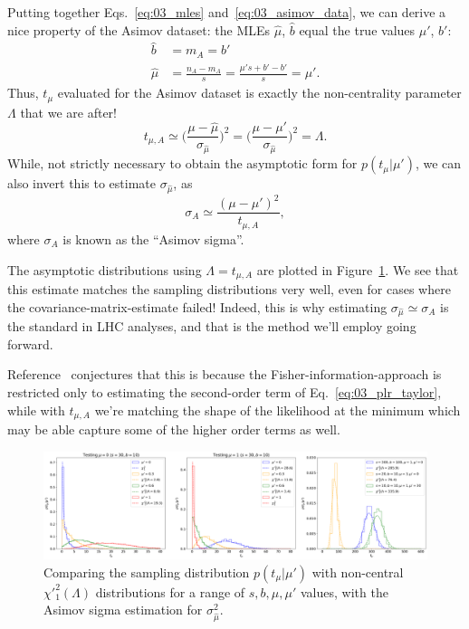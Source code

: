Putting together Eqs.~\ref{eq:03_mles} and~\ref{eq:03_asimov_data}, we can derive a nice property of the Asimov dataset: the MLEs $\hat\mu$, $\hat b$ equal the true values $\mu'$, $b'$:
\begin{align}
    \hat b &= m_A = b' \\
    \hat \mu &= \frac{n_A - m_A}{s} = \frac{\mu's + b' - b'}{s} = \mu'.
\label{eq:03_asimov_mles}
\end{align}
Thus, $t_\mu$ evaluated for the Asimov dataset is exactly the non-centrality parameter $\Lambda$ that we are after!
\begin{equation}
    t_{\mu, A} \simeq \bigg (\frac{\mu-\hat\mu}{\sigma_{\hat\mu}}\bigg)^2 = \bigg (\frac{\mu-\mu'}{\sigma_{\hat\mu}}\bigg)^2 = \Lambda.
\label{eq:03_tmuasimov}
\end{equation}
While, not strictly necessary to obtain the asymptotic form for $p(t_\mu|\mu')$, we can also invert this to estimate $\sigma_{\hat\mu}$, as
\begin{equation}
    \sigma_A \simeq \frac{(\mu-\mu')^2}{t_{\mu, A}},
\label{eq:03_asimov_sigma}
\end{equation}
where $\sigma_A$ is known as the ``Asimov sigma''.

The asymptotic distributions using $\Lambda = t_{\mu, A}$ are plotted in Figure~\ref{fig:03_ptmu_asym2}.
We see that this estimate matches the sampling distributions very well, even for cases where the covariance-matrix-estimate failed!
Indeed, this is why estimating $\sigma_{\hat\mu} \simeq \sigma_A$ is the standard in LHC analyses, and that is the method we'll employ going forward.

Reference~\cite{Cowan:2010js} conjectures that this is because the Fisher-information-approach is restricted only to estimating the second-order term of Eq.~\ref{eq:03_plr_taylor}, while with $t_{\mu, A}$ we're matching the shape of the likelihood at the minimum which may be able capture some of the higher order terms as well.

\begin{figure}[htb]
  \centering
  \includegraphics[width=\textwidth]{figures/03-Stats/06-asymptotic-plr/3.png}
  \caption{Comparing the sampling distribution $p(t_\mu|\mu')$ with non-central $\chi'^2_1(\Lambda)$ distributions for a range of $s, b, \mu, \mu'$ values, with the Asimov sigma estimation for $\sigma^2_{\hat\mu}$.}
  \label{fig:03_ptmu_asym2}
\end{figure}



